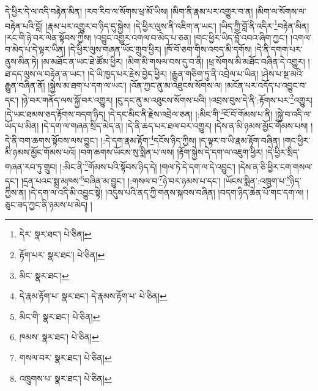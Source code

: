 དེ་ཕྱིར་དེ་ལ་འདི་བརྟེན་མིན། །རབ་རིབ་ལ་སོགས་ཕྲ་མོ་ཡིས། །མིག་ནི་རྣམ་པར་འགྱུར་བ་ན། །མིག་ལ་སོགས་ལ་བརྟེན་པའི་བློ། །རྣམ་པར་འགྱུར་བ་ཉིད་དུ་སྐྱེས། །དེ་ཕྱིར་ལུས་ནི་འཇིག་ན་ཡང་། །ཡིད་ཀྱི་བློ་ནི་འདིར་\footnote{དེར་  སྣར་ཐང་།  པེ་ཅིན། }བརྟེན་མིན། །རང་གི་ཉེ་བར་ལེན་སྟོབས་ཀྱིས། །འབྱུང་འགྱུར་འགལ་བ་མེད་པ་ཅན། །གང་ཕྱིར་ཡིད་བློ་འབའ་ཞིག་ཀྱང་། །འགལ་བ་མེད་པ་དེ་ལྟར་ཡིན། །དེ་ཕྱིར་ལུས་གཞན་ཡོང་གྲུབ་ཕྱིར། །ཁོ་བོ་ཅག་གིས་འབད་མི་དགོས། །དེ་ནི་དགག་པར་ནུས་མིན་ཏེ། །མ་མཐོང་ན་ཡང་ཐེ་ཚོམ་ཕྱིར། །མིག་མི་གསལ་བས་དུ་བ་ནི། །ཕྲ་སོགས་མི་མཐོང་བཞིན་དེ་འགྱུར། །ཐ་དད་ལུས་ལ་བརྟེན་ན་ཡང་། །དེ་ཡི་ཁྱད་པར་རྗེས་བྱེད་ཕྱིར། །རྒྱུན་གཅིག་ཏུ་ནི་འབྲེལ་པ་ཡིན། །ཤེས་པ་སྔ་མའི་རྒྱུན་བཞིན་ནོ། །སྐྱེས་མ་ཐག་པ་དག་ལ་ཡང་། །འོན་ཀྱང་ནུ་མ་འཐུངས་སོགས་ལ། །མངོན་པར་འདོད་པ་འབྱུང་བ་དང་། །ཉེ་བར་གནོད་ལས་སྐྱོ་བར་འགྱུར། །ངུ་དང་ནུ་མ་འཐུངས་སོགས་པའི། །འབྲས་བུས་དེ་ནི་:རྟོགས་པར་\footnote{རྟོག་པར་  སྣར་ཐང་།  པེ་ཅིན། }འགྱུར། །དེ་ཡང་ཐམས་ཅད་རྟོགས་བདག་ཉིད། །དེ་དང་མིང་ནི་རྗེས་འབྲེལ་ཅན། །:མིང་གི་\footnote{མིང་  སྣར་ཐང་། }ངོ་བོ་གོམས་པ་ནི། །སྐྱེ་བ་འདི་ལ་ཡོད་པ་མིན། །དེ་དག་ལ་གཞན་སྲིད་མེད་ན། །དེ་ནི་ཆད་པར་ཐལ་བར་འགྱུར། །དེས་ན་མི་ཉམས་མྱོང་གོམས་པས། །དེ་ནི་བག་ཆགས་སྟོབས་ལས་བྱུང་། །:དེ་དག་རྣམ་རྟོག་\footnote{དེ་རྣམ་རྟོག་པ་  སྣར་ཐང་། དེ་རྣམས་རྟོག་པ་  པེ་ཅིན། }དངོས་ཉིད་ཀྱིས། །ད་ལྟར་བ་ཡི་རྣམ་རྟོག་བཞིན། །གང་ཕྱིར་མི་ཉམས་མྱོང་གོམས་པའོ། །བག་ཆགས་ཡོངས་སུ་སྨིན་པ་ལས། །རྟོག་སྐྱེས་དེ་དག་ལ་འཇུག་ཕྱིར། །དེ་ཕྱིར་སྲིད་གཞན་རབ་ཏུ་གྲུབ། །:མིང་ནི་\footnote{མིང་གི་  སྣར་ཐང་།  པེ་ཅིན། }གོམས་པའི་སྟོབས་ཉིད་དེ། །གལ་ཏེ་དེ་དག་ལ་དེ་འབྱུང་། །དེས་ན་ཅི་ཕྱིར་ངག་གསལ་དང་། །དྲན་པའང་སྨྲ་མཁས་\footnote{ཁམས་  སྣར་ཐང་།  པེ་ཅིན། }བཞིན་མ་བྱུང་། །:གསལ་བ་\footnote{གསལ་བར་  སྣར་ཐང་།  པེ་ཅིན། }ཉེ་བར་ཉམས་པ་དང་། །ཡོངས་སྨིན་:འཁྲུག་པ་\footnote{འཁྲུགས་པ་  སྣར་ཐང་།  པེ་ཅིན། }ཉིད་ཀྱིས་ན། །དེ་དག་ལ་འདི་མི་འབྱུང་སྟེ། །འདུས་པའི་ནད་ཀྱི་གནས་སྐབས་བཞིན། །བདག་ཉིད་ཆེན་པོ་གང་དག་ལ། །ཅུང་ཟད་ཀྱང་ནི་ཉམས་པ་མེད། །
